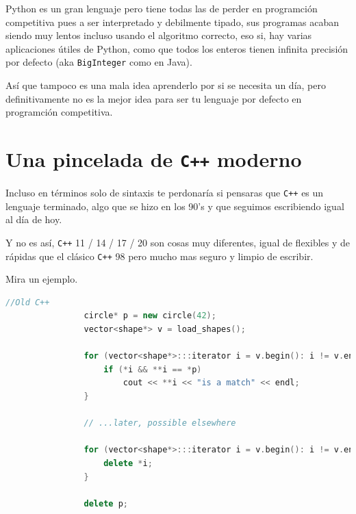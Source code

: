 \documentclass[12pt, fleqn]{report}                             %
\theoremstyle{break}                                            %
\newcommand \Cpp  {\texttt{C++} }                               %
\begin{document}
                Python es un gran lenguaje pero tiene todas las de perder en programción competitiva pues
                a ser interpretado y debilmente tipado, sus programas acaban siendo muy lentos incluso usando el 
                algoritmo correcto, eso si, hay varias aplicaciones útiles de Python, como que todos los
                enteros tienen infinita precisión por defecto (aka \texttt{BigInteger} como en Java).

                Así que tampoco es una mala idea aprenderlo por si se necesita un día, pero definitivamente
                no es la mejor idea para ser tu lenguaje por defecto en programción competitiva.


        \clearpage
        \section{ Una pincelada de \Cpp moderno}

            Incluso en términos solo de sintaxis te perdonaría si pensaras que \Cpp es un
            lenguaje terminado, algo que se hizo en los 90's y que seguimos escribiendo
            igual al día de hoy.

            Y no es así, \Cpp 11 / 14 / 17 / 20 son cosas muy diferentes, igual de flexibles
            y de rápidas que el clásico \Cpp 98 pero mucho mas seguro y limpio de escribir.

            Mira un ejemplo.

            \begin{lstlisting}[language=C++, gobble=16]
                //Old C++
                circle* p = new circle(42);
                vector<shape*> v = load_shapes();

                for (vector<shape*>:::iterator i = v.begin(): i != v.end(); ++i) {
                    if (*i && **i == *p)
                        cout << **i << "is a match" << endl;
                }

                // ...later, possible elsewhere

                for (vector<shape*>:::iterator i = v.begin(): i != v.end(); ++i) {
                    delete *i;
                }

                delete p;
            \end{lstlisting}
\end{document}

